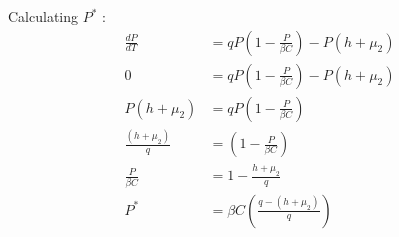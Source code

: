 \documentclass[12pt]{article}
\begin{document}
Calculating $P^{*}$ :
\begin{align*}
        \frac{dP}{dT} &= qP\left(1-\frac{P}{\beta C}\right) - P(h + \mu_{2})\\
        0 &= qP\left(1-\frac{P}{\beta C}\right) - P(h + \mu_{2})\\
        P(h+ \mu_{2}) &= qP\left(1-\frac{P}{\beta C}\right)\\
        \frac{(h+ \mu_{2})}{q} &= \left(1-\frac{P}{\beta C}\right)\\
        \frac{P}{\beta C} &= 1 - \frac{h+\mu_{2}}{q}\\
        P^{*} &= \beta C \left(\frac{q-(h+\mu_{2})}{q}\right)
    \end{align*}
\end{document}
